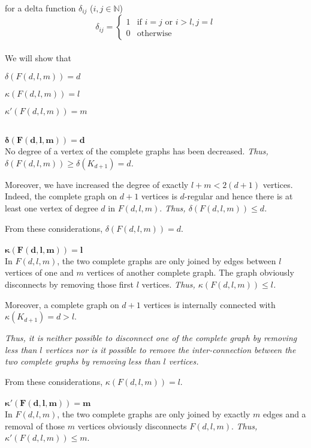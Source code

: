 \documentclass[a4paper]{article}
\begin{document}
\begin{solution}{14}
		for a delta function $\delta_{ij}$ ($i, j \in \mathbb{N}$)
		\begin{equation}
			\delta_{ij} =
					\begin{cases}
						1 & \text{if } i = j \text{ or }  i > l, j = l\\
						0 & \text{otherwise}
					\end{cases}
		\end{equation}\\
		We will show that
		\begin{compactitem}%
			\item $\delta(F(d,l,m)) = d$%
			\item $\kappa(F(d,l,m)) = l$%
			\item $\kappa'(F(d,l,m)) = m$%
		\end{compactitem}\ \\
		$\mathbf{\delta(F(d,l,m)) = d}$\\
		No degree of a vertex of the complete graphs has been decreased. \emph{Thus, $\delta(F(d,l,m)) \geq \delta(K_{d+1}) = d$.}

		Moreover, we have increased the degree of exactly $l + m < 2(d+1)$ vertices.  Indeed, the complete graph on $d+1$ vertices is $d$-regular and hence there is at least one vertex of degree $d$ in $F(d,l,m)$. \emph{Thus, $\delta(F(d,l,m)) \leq d$.}

		From these considerations, $\delta(F(d,l,m)) = d$.\ \\ \ \\
		$\mathbf{\kappa(F(d,l,m)) = l}$\\
		In $F(d,l,m)$, the two complete graphs are only joined by edges between $l$ vertices of one and $m$ vertices of another complete graph.
		The graph obviously disconnects by removing those first $l$ vertices. \emph{Thus, $\kappa(F(d,l,m)) \leq l$.}

		Moreover, a complete graph on $d+1$ vertices is internally connected with $\kappa(K_{d+1}) = d > l$. 

		\emph{Thus, it is neither possible to disconnect one of the complete graph by removing less than $l$ vertices nor is it possible to remove the inter-connection between the two complete graphs by removing less than $l$ vertices.}

		From these considerations, $\kappa(F(d,l,m)) = l$.\ \\ \ \\
		$\mathbf{\kappa'(F(d,l,m)) = m}$\\
		In $F(d,l,m)$, the two complete graphs are only joined by exactly $m$ edges and a removal of those $m$ vertices obviously disconnects $F(d, l, m)$. \emph{Thus, $\kappa'(F(d,l,m)) \leq m$}.


\end{solution}
\end{document}
